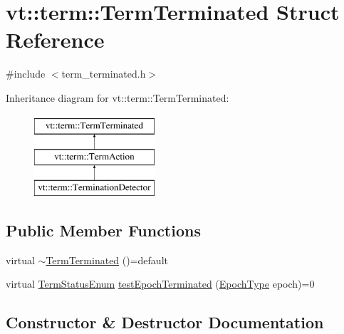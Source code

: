 \hypertarget{structvt_1_1term_1_1_term_terminated}{}\section{vt\+:\+:term\+:\+:Term\+Terminated Struct Reference}
\label{structvt_1_1term_1_1_term_terminated}


{\ttfamily \#include $<$term\+\_\+terminated.\+h$>$}

Inheritance diagram for vt\+:\+:term\+:\+:Term\+Terminated\+:\begin{figure}[H]
\begin{center}
\leavevmode
\includegraphics[height=3.000000cm]{structvt_1_1term_1_1_term_terminated}
\end{center}
\end{figure}
\subsection*{Public Member Functions}
\begin{DoxyCompactItemize}
\item 
virtual \hyperlink{structvt_1_1term_1_1_term_terminated_a8ad1615d63d994fe339aaf47aa7164c1}{$\sim$\+Term\+Terminated} ()=default
\item 
virtual \hyperlink{namespacevt_1_1term_ad8ec9b371608fc88e7fdeef219785b27}{Term\+Status\+Enum} \hyperlink{structvt_1_1term_1_1_term_terminated_a9d23b646c13a95738f72f7abfc8774c7}{test\+Epoch\+Terminated} (\hyperlink{namespacevt_a81d11b28122d43bf9834577e4a06440f}{Epoch\+Type} epoch)=0
\end{DoxyCompactItemize}


\subsection{Constructor \& Destructor Documentation}
\mbox{\label{structvt_1_1term_1_1_term_terminated_a8ad1615d63d994fe339aaf47aa7164c1}} 
